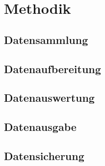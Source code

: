\chapter{Methodik}
\label{ch:method}

\blindtext

\section{Datensammlung}
\label{sec:method:data_collection}

\blindtext

\section{Datenaufbereitung}
\label{sec:method:data_preparation}

\blindtext

\section{Datenauswertung}
\label{sec:method:data_analysis}

\blindtext

\section{Datenausgabe}
\label{sec:method:data_output}

\blindtext

\section{Datensicherung}
\label{sec:method:data_backup}

\blindtext